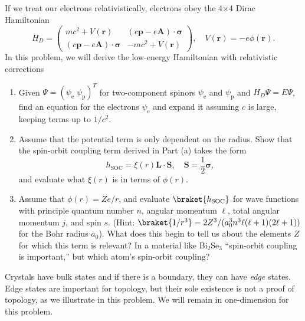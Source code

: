 \documentclass{jhwhw}
\begin{document}

If we treat our electrons relativistically, electrons obey the 4$\times$4 Dirac Hamiltonian
\begin{equation}
  \label{eq:3}
  H_{D} =
  \begin{pmatrix}
    mc^{2} + V(\mathbf r) & (c \mathbf p - e\mathbf A) \cdot \bm \sigma \\
    (c\mathbf p - e\mathbf A) \cdot \bm \sigma & -mc^{2} + V(\mathbf r)
  \end{pmatrix}, \quad V(\mathbf r) = - e \phi(\mathbf r).
\end{equation}
In this problem, we will derive the low-energy Hamiltonian with relativistic corrections
\begin{enumerate}
  \item Given $\Psi = ( \psi_{\mathrm{e}} \;\psi_{\mathrm{p}} )^{T}$ for two-component spinors $\psi_{\mathrm{e}}$ and $\psi_{\mathrm{p}}$ and $H_{D} \Psi = E \Psi$, find an equation for the electrons $\psi_{\mathrm{e}}$ and expand it assuming $c$ is large, keeping terms up to $1/c^{2}$.
  \item Assume that the potential term is only dependent on the radius. Show that the spin-orbit coupling term derived in Part (a) takes the form
        \begin{equation}
          \label{eq:4}
          h_{\mathrm{SOC}} = \xi(r) \mathbf L \cdot \mathbf S, \quad \mathbf S = \frac12 \bm \sigma,
        \end{equation}
       and evaluate what $\xi(r)$ is in terms of $\phi(r)$.
  \item Assume that $\phi(r) = Z e/ r$, and evaluate $\braket{h_{\mathrm{SOC}}}$ for wave functions with principle quantum number $n$, angular momentum $\ell$, total angular momentum $j$, and spin $s$. (Hint: $\braket{1/r^{3}} = 2 Z^{3}/(a_{0}^{3} n^{3} \ell (\ell + 1)(2\ell + 1))$ for the Bohr radius $a_{0}$). What does this begin to tell us about the elements $Z$ for which this term is relevant? In a material like Bi$_{2}$Se$_{3}$ ``spin-orbit coupling is important,'' but which atom's spin-orbit coupling?
\end{enumerate}


Crystals have bulk states and if there is a boundary, they can have \emph{edge} states.
Edge states are important for topology, but their sole existence is not a proof of topology, as we illustrate in this problem.
We will remain in one-dimension for this problem.
\end{document}
